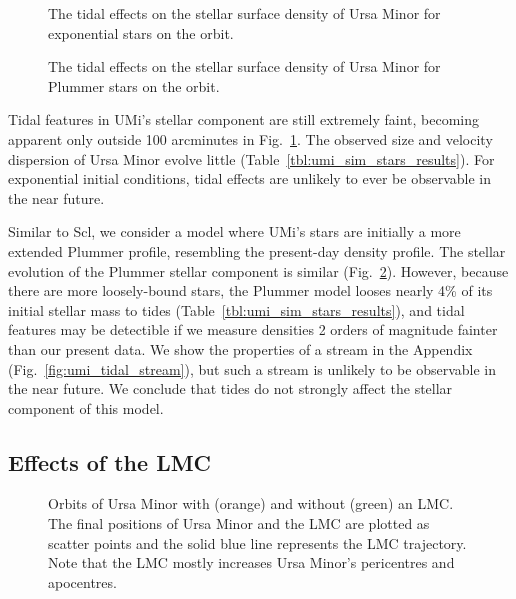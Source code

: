 \begin{figure}
\centering
{}
\caption[Ursa Minor simulated density profiles]{The tidal effects on the
stellar surface density of Ursa Minor for exponential stars on the
\smallperi{} orbit.}\label{fig:umi_smallperi_i_f}
\end{figure}

\begin{figure}
\centering
{}
\caption[Ursa Minor Plummer model density]{The tidal effects on the
stellar surface density of Ursa Minor for Plummer stars on the
\smallperi{} orbit.}\label{fig:umi_plummer_i_f}
\end{figure}

Tidal features in UMi's stellar component are still extremely faint,
becoming apparent only outside 100 arcminutes in
Fig.~\ref{fig:umi_smallperi_i_f}. The observed size and velocity
dispersion of Ursa Minor evolve little
(Table~\ref{tbl:umi_sim_stars_results}). For exponential initial
conditions, tidal effects are unlikely to ever be observable in the near
future.

Similar to Scl, we consider a model where UMi's stars are initially a
more extended Plummer profile, resembling the present-day density
profile. The stellar evolution of the Plummer stellar component is
similar (Fig.~\ref{fig:umi_plummer_i_f}). However, because there are
more loosely-bound stars, the Plummer model looses nearly 4\% of its
initial stellar mass to tides (Table~\ref{tbl:umi_sim_stars_results}),
and tidal features may be detectible if we measure densities 2 orders of
magnitude fainter than our present data. We show the properties of a
stream in the Appendix (Fig.~\ref{fig:umi_tidal_stream}), but such a
stream is unlikely to be observable in the near future. We conclude that
tides do not strongly affect the stellar component of this model.

\subsection{Effects of the LMC}\label{effects-of-the-lmc}

\begin{figure}
\centering
{}
\caption[Ursa Minor orbits with LMC]{Orbits of Ursa Minor with (orange)
and without (green) an LMC. The final positions of Ursa Minor and the
LMC are plotted as scatter points and the solid blue line represents the
LMC trajectory. Note that the LMC mostly increases Ursa Minor's
pericentres and apocentres.}\label{fig:umi_orbits_lmc}
\end{figure}

